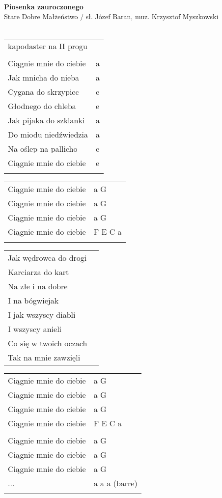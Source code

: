 \documentclass[a5paper]{article}
\begin{document}


\noindent
\fontsize{12pt}{15pt}\selectfont
\textbf{Piosenka zauroczonego} \\
\fontsize{8pt}{10pt}\selectfont
Stare Dobre Małżeństwo / sł. Józef Baran, muz. Krzysztof Myszkowski \\ \\
\fontsize{10pt}{12pt}\selectfont
{}
\begin{tabular}{@{}p{7.00cm}p{3cm}@{}}
\noindent
kapodaster na II progu \\ \\
Ciągnie mnie do ciebie & a \\
Jak mnicha do nieba & a \\
Cygana do skrzypiec & e \\
Głodnego do chleba & e \\
Jak pijaka do szklanki & a  \\
Do miodu niedźwiedzia & a \\
Na oślep na pallicho & e \\
Ciągnie mnie do ciebie & e \\ \\
\end{tabular}

\noindent
\begin{tabular}{@{}p{6.00cm}p{3cm}@{}}
Ciągnie mnie do ciebie & a G \\
Ciągnie mnie do ciebie & a G \\
Ciągnie mnie do ciebie & a G \\
Ciągnie mnie do ciebie & F E C a \\ \\
\end{tabular}

\noindent
\begin{tabular}{@{}p{9.00cm}p{3cm}@{}}
Jak wędrowca do drogi \\
Karciarza do kart \\
Na złe i na dobre \\
I na bógwiejak \\
I jak wszyscy diabli \\
I wszyscy anieli \\
Co się w twoich oczach \\
Tak na mnie zawzięli
\end{tabular}

\noindent
\begin{tabular}{@{}p{6.00cm}p{3cm}@{}}
Ciągnie mnie do ciebie & a G \\
Ciągnie mnie do ciebie & a G \\
Ciągnie mnie do ciebie & a G \\
Ciągnie mnie do ciebie & F E C a \\ \\
Ciągnie mnie do ciebie & a G \\
Ciągnie mnie do ciebie & a G \\
Ciągnie mnie do ciebie & a G \\
... & a a a (barre) \\ \\
\end{tabular}
\end{document}
